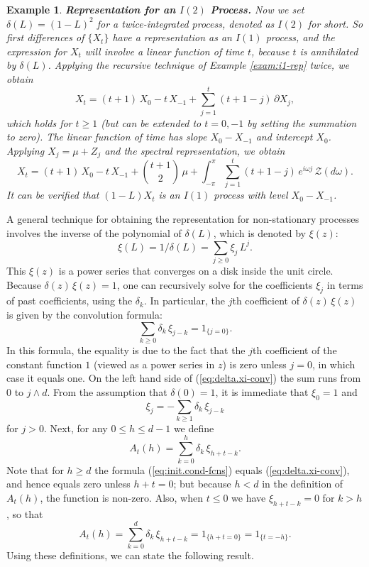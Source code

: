 \documentclass[a4paper]{book}
\newtheorem{Example}{Example}
\begin{document}
\begin{Example} {\bf Representation for an $I(2)$ Process.} \rm
\label{exam:i2-rep}
  Now we set  $\delta (L)= {(1-L)}^2$  for a twice-integrated process,
  denoted as $I(2)$ for short.    So first differences of $\{ X_t \}$ 
  have a representation as an $I(1)$ process, and the expression for
   $X_t$ will involve a linear function of time $t$, because $t$ is
  annihilated by $\delta (L)$.  Applying the recursive technique of 
  Example \ref{exam:i1-rep} twice, we obtain
 \[
 X_t = (t+1) \, X_0 - t \, X_{-1}  + \sum_{j=1}^t (t+1-j) \, \partial X_j,
\]
 which holds for $t \geq 1$  (but can be extended to $t=0,-1$ by setting
  the summation to zero).  The linear function of time has slope
  $X_0 - X_{-1}$ and intercept $X_0$.
 Applying $X_j = \mu + Z_j$ and the spectral representation,
  we obtain
\begin{equation*}
 X_t =(t+1) \, X_0 - t \, X_{-1}  + \binom{t+1}{2} \, \mu
 +  \int_{-\pi}^{\pi} \sum_{j=1}^t (t+1-j) \, e^{i \omega j}
   \, \mathcal{Z} (d\omega).  
\end{equation*}
 It can be verified that $(1-L) X_t$ is an $I(1)$ process with level
 $X_0 - X_{-1}$.
\end{Example}

A general technique for obtaining the representation for non-stationary 
processes involves the     inverse of the polynomial of $\delta(L)$, which is
 denoted by $\xi (z)$:
\begin{equation}
\label{eq:xi-def}
 \xi (L) = 1/ \delta (L) = \sum_{j \geq 0 }  \xi_j \, L^j.
\end{equation}
 This $\xi (z)$ is a power series that converges on a disk inside the unit circle.
  Because $\delta (z) \, \xi (z) = 1$, one can recursively solve for the
   coefficients $\xi_j$ in terms of past coefficients, using the $\delta_k$.
  In particular, the $j$th coefficient of $\delta (z) \, \xi (z)$ is given by
  the convolution formula:
\begin{equation}
\label{eq:delta.xi-conv}
  \sum_{k \geq 0} \delta_k \, \xi_{j-k} = 1_{ \{ j=0 \} }.
\end{equation}
  In this formula, the equality is due to the fact that the $j$th coefficient of
   the constant function $1$ (viewed as a power series in $z$) is zero unless $j=0$,
   in which case it equals one.  On the left hand side of (\ref{eq:delta.xi-conv})
   the sum runs from $0$ to  $j \wedge d$.  From the assumption that $\delta (0) =1$,
 it is immediate that $\xi_0 = 1$ and 
  \[
  \xi_j = - \sum_{k \geq 1} \delta_k \, \xi_{j-k}
  \]
for $j > 0$.  Next, for any $ 0 \leq h \leq d-1$ we define
\begin{equation}
\label{eq:init.cond-fcns}
  A_{t} (h) = \sum_{k=0}^h \delta_k \, \xi_{h+t-k}.
\end{equation}
 Note that for $h \geq d$ the formula (\ref{eq:init.cond-fcns}) equals 
 (\ref{eq:delta.xi-conv}), and hence equals zero unless $h+t = 0$; but because
$h < d$ in the definition of $A_t (h)$, the function is non-zero.
  Also, when $ t \leq 0$ we have $\xi_{h+t-k} = 0$ for $ k > h$, so that
\[
 A_t (h) = \sum_{k=0}^d \delta_k \, \xi_{h+t-k} = 1_{ \{ h+t = 0 \} } = 1_{ \{ t = -h \}}.
\]
 Using these definitions, we can state the following result.
 
\end{document}
